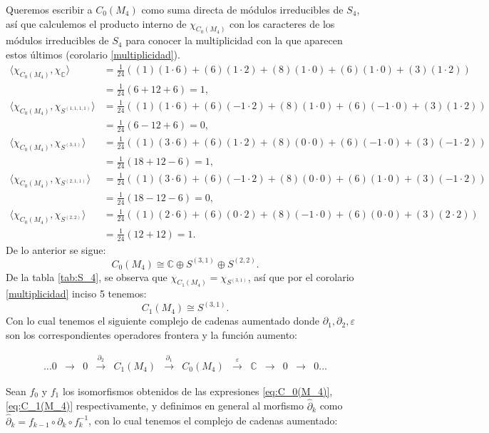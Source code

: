 \documentclass[12pt]{book}
\theoremstyle{definition}
\newcounter{in}
\newcounter{ini}
\begin{document}
Queremos escribir a $C_{0}(M_{4})$ como suma directa de módulos
irreducibles de $S_{4}$, así que calculemos el producto interno de $\chi_{C_{0}(M_{4})}$ con los
caracteres de los módulos irreducibles de $S_{4}$ para conocer la
multiplicidad con la que aparecen estos últimos (corolario \ref{multiplicidad}).
\begin{align*}
  \langle\chi_{C_{0}(M_{4})},\chi_{\mathbb{C}}\rangle &=\frac{1}{24}((1)(1\cdot6)+(6)(1\cdot2)+(8)(1\cdot0)+(6)(1\cdot0)+(3)(1\cdot2))\\
  &=\frac{1}{24}(6+12+6)=1,\\
  \langle\chi_{C_{0}(M_{4})},\chi_{S^{(1,1,1,1)}}\rangle &=\frac{1}{24}((1)(1\cdot6)+(6)(-1\cdot2)+(8)(1\cdot0)+(6)(-1\cdot0)+(3)(1\cdot2))\\
  &=\frac{1}{24}(6-12+6)=0,\\
  \langle\chi_{C_{0}(M_{4})},\chi_{S^{(3,1)}}\rangle &=\frac{1}{24}((1)(3\cdot6)+(6)(1\cdot2)+(8)(0\cdot0)+(6)(-1\cdot0)+(3)(-1\cdot2))\\
  &=\frac{1}{24}(18+12-6)=1,\\
  \langle\chi_{C_{0}(M_{4})},\chi_{S^{(2,1,1)}}\rangle &=\frac{1}{24}((1)(3\cdot6)+(6)(-1\cdot2)+(8)(0\cdot0)+(6)(1\cdot0)+(3)(-1\cdot2))\\
  &=\frac{1}{24}(18-12-6)=0,\\
  \langle\chi_{C_{0}(M_{4})},\chi_{S^{(2,2)}}\rangle &=\frac{1}{24}((1)(2\cdot6)+(6)(0\cdot2)+(8)(-1\cdot0)+(6)(0\cdot0)+(3)(2\cdot2))\\
  &=\frac{1}{24}(12+12)=1.
\end{align*}
De lo anterior se sigue:
\begin{equation}
  \label{eq:C_0(M_4)}
  C_{0}(M_{4})\cong \mathbb{C}\oplus S^{(3,1)}\oplus S^{(2,2)}.
\end{equation}
De la tabla \ref{tab:S_4},
se observa que $\chi_{C_{1}(M_{4})}=\chi_{S^{(3,1)}}$, así que
por el corolario \ref{multiplicidad} inciso 5 tenemos: 
\begin{equation}
  \label{eq:C_1(M_4)}
  C_{1}(M_{4})\cong S^{(3,1)}.
\end{equation}
Con lo cual tenemos el siguiente complejo de cadenas aumentado
donde $\partial_{1},\partial_{2},\varepsilon$ son los correspondientes
operadores frontera y la función aumento:

\begin{small}
  \[
    \begin{array}{ccccccccccccc}
      \dots 0 & \rightarrow & 0 &
      \stackrel{\partial_{2}}{\rightarrow} & C_{1}(M_{4}) &
      \stackrel{\partial_{1}}{\rightarrow} & C_{0}(M_{4}) & \stackrel{\varepsilon}{\rightarrow} &
      \mathbb{C} & \rightarrow  & 0 & \rightarrow & 0 \dots
    \end{array} 
    \]
  \end{small}
Sean $f_{0}$ y $f_{1}$ los isomorfismos obtenidos de las expresiones
\ref{eq:C_0(M_4)}, \ref{eq:C_1(M_4)} respectivamente, y definimos en
general al morfismo $\widehat\partial_{k}$ como
$\widehat\partial_{k}=f_{k-1}\circ \partial_{k}\circ f^{-1}_{k}$, con
lo cual tenemos el complejo de cadenas aumentado: 
\end{document}
